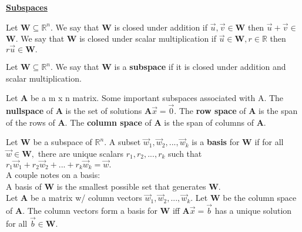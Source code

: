 \documentclass{article}
\begin{document}
\textbf{\underline{Subspaces}}
\begin{definition}
Let $\boldsymbol{W} \subseteq \mathbb{R}^n.$ We say that $\boldsymbol{W}$ is closed under addition if $\vec{u}, \vec{v} \in \boldsymbol{W}$ then $\vec{u}+\vec{v} \in$ $\boldsymbol{W}$. We say that $\boldsymbol{W}$ is closed under scalar multiplication if $\vec{u} \in \boldsymbol{W}, r \in \mathbb{R}$ then $r\vec{u} \in \boldsymbol{W}.$ 
\end{definition}

\begin{definition}
Let $\boldsymbol{W} \subseteq \mathbb{R}^n.$ We say that $\boldsymbol{W}$ is a \textbf{subspace} if it is closed under addition and scalar multiplication.

\end{definition}

\begin{definition}

Let $\boldsymbol{A}$ be a m x n matrix. Some important subspaces associated with A. The \textbf{nullspace} of $\boldsymbol{A}$ is the set of solutions $\boldsymbol{A}\vec{x} = \vec{0}.$ The \textbf{row space} of $\boldsymbol{A}$ is the span of the rows of $\boldsymbol{A}.$ The \textbf{column space} of $\boldsymbol{A}$ is the span of columns of $\boldsymbol{A}.$ 

\end{definition}

\begin{definition}
Let $\boldsymbol{W}$ be a subspace of $\mathbb{R}^n.$ A subset $\vec{w}_1, \vec{w}_2, ..., \vec{w}_k$ is a \textbf{basis} for $\boldsymbol{W}$ if for all $\vec{w} \in \boldsymbol{W},$ there are unique scalars $r_1, r_2, ..., r_k$ such that $r_1\vec{w}_{1} + r_2\vec{w}_{2} + ... + r_k\vec{w}_{k} = \vec{w}.$ \\

A couple notes on a basis: \\
A basis of $\boldsymbol{W}$ is the smallest possible set that generates $\boldsymbol{W}.$ \\
Let $\boldsymbol{A}$ be a matrix w/ column vectors $\vec{w}_1, \vec{w}_2, ..., \vec{w}_{k}.$ Let $\boldsymbol{W}$ be the column space of $\boldsymbol{A}$. The column vectors form a  basis for $\boldsymbol{W}$ iff $\boldsymbol{A}\vec{x} = \vec{b}$ has a unique solution for all $\vec{b} \in \boldsymbol{W}.$ 

\end{definition}
\end{document}

